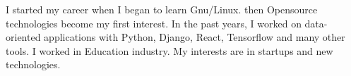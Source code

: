 \documentclass[9pt]{developercv}
\begin{document}
\vspace{0.5cm}

\begin{minipage}[t]{1\textwidth} %
	\vspace{-\baselineskip} %



	I started my career when I began to learn Gnu/Linux. then Opensource technologies become my first interest.
	In the past years, I worked on data-oriented applications with Python, Django, React, Tensorflow and many other tools. I worked in Education  industry. My interests are in startups and new technologies.  \\
	\ %
\end{minipage}
\hfill %


\begin{center}
\end{center}

\end{document}
